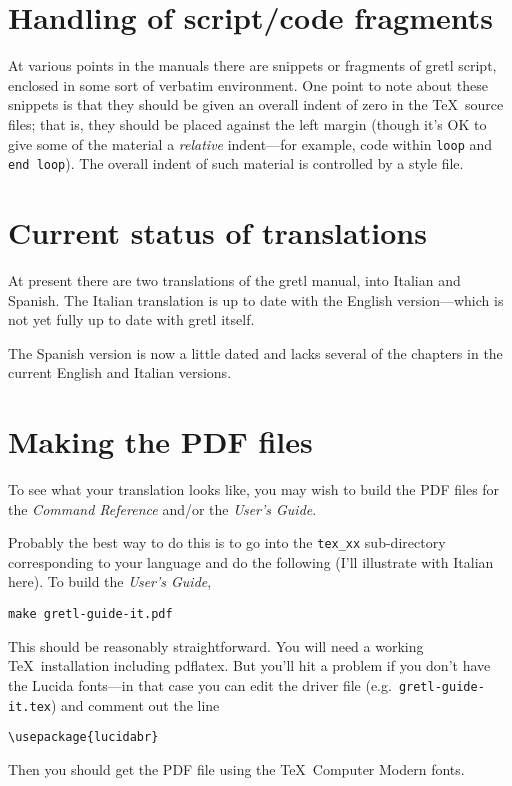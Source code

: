 \documentclass{article}
\begin{document}
\section{Handling of script/code fragments}

At various points in the manuals there are snippets or fragments of
\textsf{gretl} script, enclosed in some sort of verbatim environment.
One point to note about these snippets is that they should be given an
overall indent of zero in the \TeX\ source files; that is, they should
be placed against the left margin (though it's OK to give some of the
material a \textit{relative} indent---for example, code within
\texttt{loop} and \texttt{end loop}).  The overall indent of such
material is controlled by a style file.

\section{Current status of translations}

At present there are two translations of the \textsf{gretl} manual,
into Italian and Spanish.  The Italian translation is up to date with
the English version---which is not yet fully up to date with
\textsf{gretl} itself.

The Spanish version is now a little dated and lacks several of the
chapters in the current English and Italian versions.  

\section{Making the PDF files}

To see what your translation looks like, you may wish to build the PDF
files for the \textit{Command Reference} and/or the \textit{User's
  Guide}.

Probably the best way to do this is to go into the \texttt{tex\_xx}
sub-directory corresponding to your language and do the following
(I'll illustrate with Italian here).  To build the \textit{User's
  Guide},

\begin{verbatim}
make gretl-guide-it.pdf
\end{verbatim}

This should be reasonably straightforward.  You will need a working
\TeX\ installation including \textsf{pdflatex}.  But you'll hit a
problem if you don't have the \textsf{Lucida} fonts---in that case you
can edit the driver file (e.g.\ \texttt{gretl-guide-it.tex}) and
comment out the line
%
\begin{verbatim}
\usepackage{lucidabr}
\end{verbatim}
%
Then you should get the PDF file using the \TeX\ Computer Modern
fonts.
\end{document}

